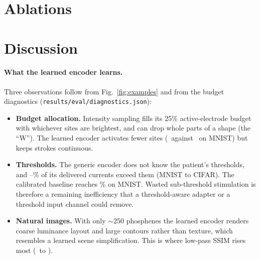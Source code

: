 \section{Ablations}\label{sec:ablation}
\GenAblationTable


\section{Discussion}
\paragraph{What the learned encoder learns.} Three observations follow from Fig.~\ref{fig:examples} and from the budget diagnostics (\texttt{results/eval/diagnostics.json}):
\begin{itemize}
\item \textbf{Budget allocation.} Intensity sampling fills its 25\% active-electrode budget with whichever sites are brightest, and can drop whole parts of a shape (the ``W''). The learned encoder activates fewer sites (\NumMnistLearnActive\ against \NumMnistIntActive\ on MNIST) but keeps strokes continuous.
\item \textbf{Thresholds.} The generic encoder does not know the patient's thresholds, and \NumMnistLearnSupraPct--\NumCifarLearnSupraPct\% of its delivered currents exceed them (MNIST to CIFAR). The calibrated baseline reaches \NumMnistIntSupraPct\% on MNIST. Wasted sub-threshold stimulation is therefore a remaining inefficiency that a threshold-aware adapter or a threshold input channel could remove.
\item \textbf{Natural images.} With only $\sim$250 phosphenes the learned encoder renders coarse luminance layout and large contours rather than texture, which resembles a learned scene simplification. This is where low-pass SSIM rises most (\NumCifarIntLp\ to \NumCifarAdaptLp).
\end{itemize}

